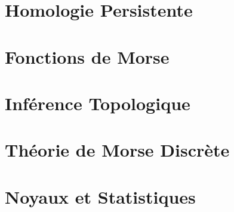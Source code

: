 \documentclass[info, math]{mpb-cours}
\begin{document}
\section{Homologie Persistente}

\section{Fonctions de Morse}

\section{Inférence Topologique}

\section{Théorie de Morse Discrète}

\section{Noyaux et Statistiques}
\end{document}
